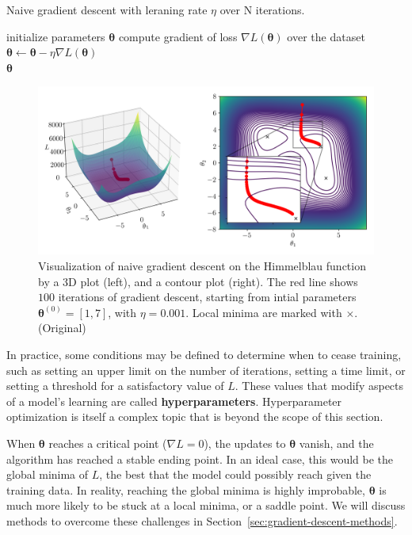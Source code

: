 \documentclass[12pt]{report}
\theoremstyle{definition}
\theoremstyle{remark}
\begin{document}
\begin{algorithm}
    \caption{Naive gradient descent with leraning rate $\eta$ over N iterations.}\label{alg:naive-gd}
    \begin{algorithmic}[1]
        \State initialize parameters $\boldsymbol{\theta}$
            \State compute gradient of loss $\nabla L(\boldsymbol{\theta})$ over the dataset
            \State $\boldsymbol{\theta} \leftarrow \boldsymbol{\theta} - \eta \nabla L(\boldsymbol{\theta})$
        \EndFor \\
        \Return $\boldsymbol{\theta}$
    \end{algorithmic}
\end{algorithm}
\begin{figure}[h]
    \centering
    \includegraphics[width=\linewidth]{figs/gradient_descent.png}
    \caption{Visualization of naive gradient descent on the Himmelblau function \cite{jamil_literature_2013} by a 3D plot (left), and a contour plot (right). The red line shows $100$ iterations of gradient descent, starting from intial parameters $\boldsymbol{\theta}^{(0)} = [1,7]$, with $\eta = 0.001$. Local minima are marked with $\times$. (Original)}
    \label{fig:enter-label}
\end{figure}

In practice, some conditions may be defined to determine when to cease training, such as setting an upper limit on the number of iterations, setting a time limit, or setting a threshold for a satisfactory value of $L$. These values that modify aspects of a model's learning are called \textbf{\glspl{hyperparameter}}. Hyperparameter optimization is itself a complex topic that is beyond the scope of this section.

When $\boldsymbol{\theta}$ reaches a critical point ($\nabla L = 0$), the updates to $\boldsymbol{\theta}$ vanish, and the algorithm has reached a stable ending point. In an ideal case, this would be the global minima of $L$, the best that the model could possibly reach given the training data. In reality, reaching the global minima is highly improbable, $\boldsymbol{\theta}$ is much more likely to be stuck at a local minima, or a saddle point. We will discuss methods to overcome these challenges in Section~\ref{sec:gradient-descent-methods}.
\end{document}
